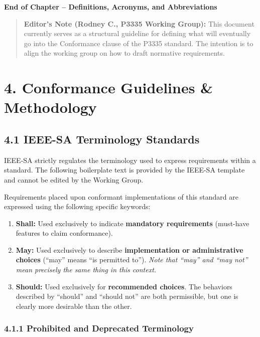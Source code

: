 \textbf{End of Chapter -- Definitions, Acronyms, and Abbreviations}

\begin{quote}
\textbf{Editor's Note (Rodney C., P3335 Working Group):} This document
currently serves as a structural guideline for defining what will
eventually go into the Conformance clause of the P3335 standard. The
intention is to align the working group on how to draft normative
requirements.
\end{quote}

\section{4. Conformance Guidelines \&
Methodology}\label{conformance-guidelines-methodology}

\subsection{4.1 IEEE-SA Terminology
Standards}\label{ieee-sa-terminology-standards}

IEEE-SA strictly regulates the terminology used to express requirements
within a standard. The following boilerplate text is provided by the
IEEE-SA template and cannot be edited by the Working Group.

Requirements placed upon conformant implementations of this standard are
expressed using the following specific keywords:

\begin{enumerate}
\def\labelenumi{\arabic{enumi}.}
\tightlist
\item
  \textbf{Shall:} Used exclusively to indicate \textbf{mandatory
  requirements} (must-have features to claim conformance).
\item
  \textbf{May:} Used exclusively to describe \textbf{implementation or
  administrative choices} (``may'' means ``is permitted to'').
  \emph{Note that ``may'' and ``may not'' mean precisely the same thing
  in this context.}
\item
  \textbf{Should:} Used exclusively for \textbf{recommended choices}.
  The behaviors described by ``should'' and ``should not'' are both
  permissible, but one is clearly more desirable than the other.
\end{enumerate}

\subsubsection{4.1.1 Prohibited and Deprecated
Terminology}\label{prohibited-and-deprecated-terminology}

